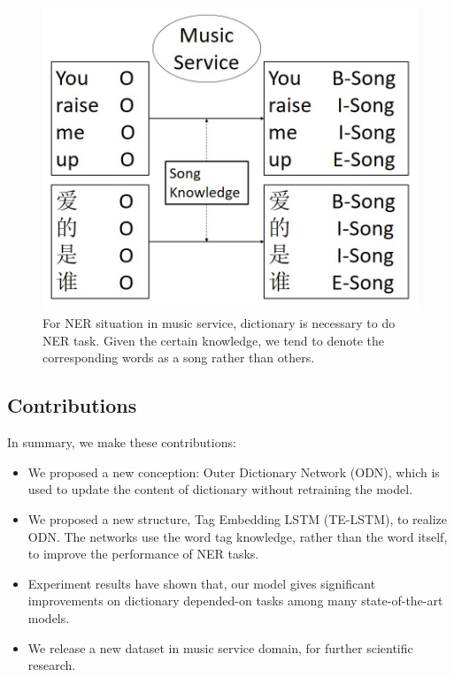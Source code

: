 \documentclass[letterpaper]{article} %
\begin{document}
\begin{figure}[t]
\centering
\includegraphics[width=.9\columnwidth]{gazzete_is_needed} %
\caption{For NER situation in music service, dictionary is necessary to do NER task. Given the certain knowledge, we tend to denote the corresponding words as a song rather than others.}
\label{fig_gazzete}
\end{figure}

\subsection{Contributions}

In summary, we make these contributions:

\begin{itemize}
\item We proposed a new conception: Outer Dictionary Network (ODN), which is used to update the content of dictionary without retraining the model.
\item We proposed a new structure, Tag Embedding LSTM (TE-LSTM), to realize ODN. The networks use the word tag knowledge, rather than the word itself, to improve the performance of NER tasks.
\item Experiment results have shown that, our model gives significant improvements on dictionary depended-on tasks among many state-of-the-art models.
\item We release a new dataset in music service domain, for further scientific research.
\end{itemize}
\end{document}
